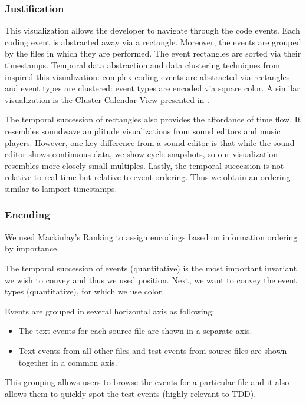 \documentclass[journal]{vgtc}                %
\begin{document}
\subsubsection{Justification}

This visualization allows the developer to navigate through the code events.
Each coding event is abstracted away via a rectangle. Moreover, the events are grouped by the files in which they are performed. The event rectangles are sorted via their timestamps. Temporal data abstraction and data clustering techniques from \cite{one} inspired this visualization: complex coding events are abstracted via rectangles and event types are clustered: event types are encoded via square color. A similar visualization is the Cluster Calendar View presented in \cite{one}.

The temporal succession of rectangles also provides the affordance of time flow. It resembles soundwave amplitude visualizations from sound editors and music players.
However, one key difference from a sound editor is that while the sound editor shows continuous data, we show cycle snapshots, so our visualization resembles more closely small multiples.
Lastly, the temporal succession is not relative to real time but relative to event ordering. Thus we obtain an ordering similar to lamport timestamps.

\subsubsection{Encoding}

We used Mackinlay's Ranking to assign encodings based on information ordering by importance.

The temporal succession of events (quantitative) is the most important invariant we wish to convey and thus we used position.
Next, we want to convey the event types (quantitative), for which we use color.

Events are grouped in several horizontal axis as following: 
\begin{itemize}
	\item The text events for each source file are shown in a separate axis.
	\item Text events from all other files and test events from source files are shown together in a common axis.
\end{itemize}
This grouping allows users to browse the events for a particular file and it also allows them to quickly spot the test events (highly relevant to TDD).
\end{document}

